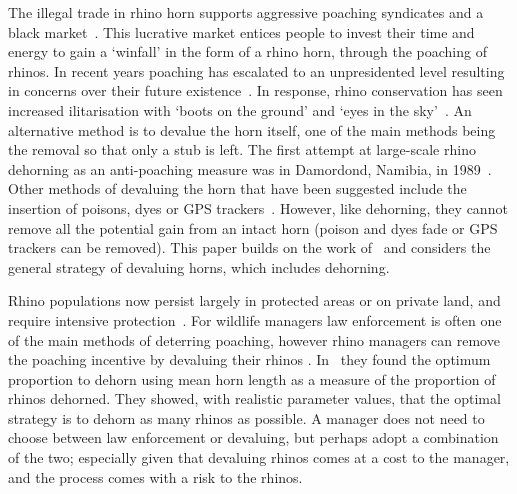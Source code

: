 \documentclass[10pt]{article}
\begin{document}
The illegal trade in rhino horn supports aggressive poaching syndicates and a 
black market~\cite{Nowell1992}. This lucrative market entices people to invest
their time and energy to gain a `winfall' in the form of a rhino horn, through the 
poaching of rhinos. In recent years poaching has escalated to an unpresidented 
level resulting in concerns over their future existence~\cite{Smith1993}. In 
response, rhino conservation has seen increased  ilitarisation with `boots on the 
ground' and `eyes in the sky'~\cite{duffy_st}. An alternative method is to 
devalue the horn itself, one of the main  methods being the removal so that only
a stub is left. The first attempt at large-scale rhino dehorning as an anti-poaching
measure was in Damordond,  Namibia, in 1989~\cite{Milner1992}. Other methods of devaluing the horn that have been suggested include
the insertion of poisons, dyes or GPS trackers~\cite{Gill2010,Smith1993}. However, 
like dehorning, they cannot remove all the potential gain from an intact horn 
(poison and dyes fade or GPS trackers can be removed). This paper builds on 
the work of~\cite{Lee} and considers the general strategy of devaluing horns,
which includes dehorning.

Rhino populations now persist largely in protected areas or on private land, and
require intensive protection~\cite{Ferreira2014}. For wildlife managers law 
enforcement is often one of the main methods of deterring poaching, however 
rhino managers can remove the poaching incentive by devaluing their rhinos 
\cite{Milner1992}. In~\cite{Milner1992} they found the 
optimum proportion to dehorn using mean horn length as a measure of the 
proportion of rhinos dehorned. They showed, with realistic parameter values, 
that the optimal strategy is to dehorn as many rhinos as possible. 
A manager does not need to choose between law enforcement or devaluing, but
perhaps adopt a combination of the two; especially given that devaluing rhinos 
comes at a cost to the manager, and the process comes with a risk to the rhinos.
\end{document}
